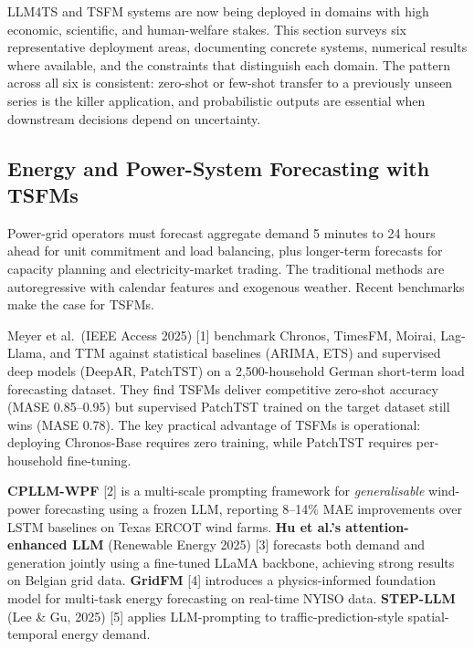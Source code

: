 \documentclass{article}
\begin{document}
LLM4TS and TSFM systems are now being deployed in domains with high economic, scientific, and human-welfare stakes. This section surveys six representative deployment areas, documenting concrete systems, numerical results where available, and the constraints that distinguish each domain. The pattern across all six is consistent: zero-shot or few-shot transfer to a previously unseen series is the killer application, and probabilistic outputs are essential when downstream decisions depend on uncertainty.

\subsection{Energy and Power-System Forecasting with TSFMs}\label{energy-and-power-system-forecasting-with-tsfms}

Power-grid operators must forecast aggregate demand 5 minutes to 24 hours ahead for unit commitment and load balancing, plus longer-term forecasts for capacity planning and electricity-market trading. The traditional methods are autoregressive with calendar features and exogenous weather. Recent benchmarks make the case for TSFMs.

Meyer et al.~(IEEE Access 2025) {[}1{]} benchmark Chronos, TimesFM, Moirai, Lag-Llama, and TTM against statistical baselines (ARIMA, ETS) and supervised deep models (DeepAR, PatchTST) on a 2,500-household German short-term load forecasting dataset. They find TSFMs deliver competitive zero-shot accuracy (MASE 0.85--0.95) but supervised PatchTST trained on the target dataset still wins (MASE 0.78). The key practical advantage of TSFMs is operational: deploying Chronos-Base requires zero training, while PatchTST requires per-household fine-tuning.

\textbf{CPLLM-WPF} \citep{liu2025calfaligningllmsfo} {[}2{]} is a multi-scale prompting framework for \emph{generalisable} wind-power forecasting using a frozen LLM, reporting 8--14\% MAE improvements over LSTM baselines on Texas ERCOT wind farms. \textbf{Hu et al.'s attention-enhanced LLM} (Renewable Energy 2025) {[}3{]} forecasts both demand and generation jointly using a fine-tuned LLaMA backbone, achieving strong results on Belgian grid data. \textbf{GridFM} \citep{sayghe20262026} {[}4{]} introduces a physics-informed foundation model for multi-task energy forecasting on real-time NYISO data. \textbf{STEP-LLM} (Lee \& Gu, 2025) {[}5{]} applies LLM-prompting to traffic-prediction-style spatial-temporal energy demand.
\end{document}
